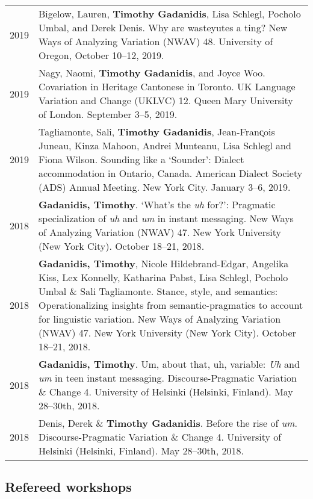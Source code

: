 \documentclass[letterpaper]{article}
\begin{document}
\begin{longtable}{p{}p{}}
    2019 & Bigelow, Lauren, \textbf{Timothy Gadanidis}, Lisa Schlegl, Pocholo
    Umbal, and Derek Denis. Why are wasteyutes a ting? New Ways of Analyzing
    Variation (NWAV) 48. University of Oregon, October 10--12, 2019. \\
    2019 & Nagy, Naomi, \textbf{Timothy Gadanidis}, and Joyce Woo. Covariation
    in Heritage Cantonese in Toronto. UK Language Variation and Change (UKLVC)
    12. Queen Mary University of London. September 3--5, 2019. \\
    2019 & Tagliamonte, Sali, \textbf{Timothy Gadanidis}, Jean-Fran\k{c}ois
    Juneau, Kinza Mahoon, Andrei Munteanu, Lisa Schlegl and Fiona Wilson.
    Sounding like a `Sounder': Dialect accommodation in Ontario, Canada.
    American Dialect Society (ADS) Annual Meeting. New York City. January 3--6,
    2019. \\
    2018 & \textbf{Gadanidis, Timothy}.  `What’s the \emph{uh} for?': Pragmatic
    specialization of \emph{uh} and \emph{um} in instant messaging.  New Ways of
    Analyzing Variation (NWAV) 47.  New York University (New York City). October
    18--21, 2018. \\
    2018 & \textbf{Gadanidis, Timothy}, Nicole Hildebrand-Edgar, Angelika Kiss,
    Lex Konnelly, Katharina Pabst, Lisa Schlegl, Poc\-holo Umbal \& Sali
    Tagliamonte.  Stance, style, and semantics: Operationalizing insights from
    seman\-tic-pragmatics to account for linguistic variation.  New Ways of
    Analyzing Variation (NWAV) 47. New York University (New York City). October
    18--21, 2018. \\
    2018 & \textbf{Gadanidis, Timothy}.  Um, about that, uh, variable: \emph{Uh}
    and \emph{um} in teen instant messaging.  Discourse-Pragmatic Variation \&
    Change 4. University of Helsinki (Helsinki, Finland). May 28--30th, 2018. \\
    2018 & Denis, Derek \& \textbf{Timothy Gadanidis}.  Before the rise of
    \emph{um}.  Discourse-Pragmatic Variation \& Change 4. University of
    Helsinki (Helsinki, Finland). May 28--30th, 2018. \\
\end{longtable}

\subsection*{Refereed workshops}
\end{document}
